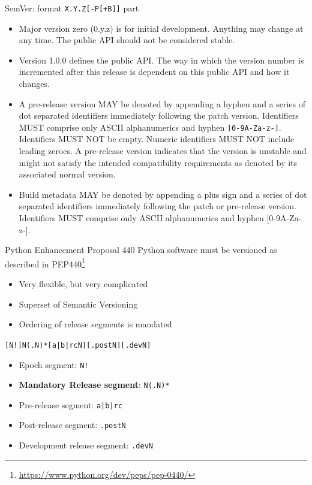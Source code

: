 \documentclass[presentation]{beamer}
\newcommand{\fnurl}[1]{\footnote{\url{#1}}}
\begin{document}
\begin{frame}[allowframebreaks]{SemVer: format \texttt{X.Y.Z[-P[+B]]} part}
\begin{itemize}
        \item Major version zero (0.y.z) is for initial development. Anything may change at any time. The public API should not be considered stable.
        \item Version 1.0.0 defines the public API. The way in which the version number is incremented after this release is dependent on this public API and how it changes.
        \item A pre-release version MAY be denoted by appending a hyphen and a series of dot separated identifiers immediately following the patch version. Identifiers MUST comprise only ASCII alphanumerics and hyphen \texttt{[0-9A-Za-z-]}. Identifiers MUST NOT be empty. Numeric identifiers MUST NOT include leading zeroes. A pre-release version indicates that the version is unstable and might not satisfy the intended compatibility requirements as denoted by its associated normal version.
        \item Build metadata MAY be denoted by appending a plus sign and a series of dot separated identifiers immediately following the patch or pre-release version. Identifiers MUST comprise only ASCII alphanumerics and hyphen [0-9A-Za-z-].
    \end{itemize}
\end{frame}

\begin{frame}{Python Enhancement Proposal 440}
    Python software must be versioned as described in PEP440\fnurl{https://www.python.org/dev/peps/pep-0440/}
    \begin{itemize}
        \item Very flexible, but very complicated
        \item Superset of Semantic Versioning
        \item Ordering of release segments is mandated
    \end{itemize}
    \texttt{[N!]N(.N)*[{a|b|rc}N][.postN][.devN]}
    \begin{itemize}
        \item Epoch segment: \texttt{N!}
        \item \textbf{Mandatory Release segment}: \texttt{N(.N)*}
        \item Pre-release segment: \texttt{{a|b|rc}}
        \item Post-release segment: \texttt{.postN}
        \item Development release segment: \texttt{.devN}
    \end{itemize}
\end{frame}
\end{document}
